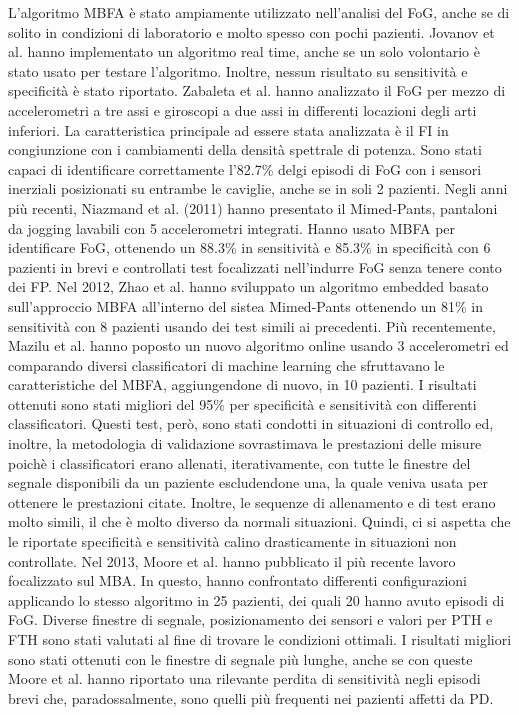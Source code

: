 L'algoritmo MBFA è stato ampiamente utilizzato nell'analisi del FoG, anche se di solito in condizioni di laboratorio e molto spesso con pochi pazienti. Jovanov et al. hanno implementato un algoritmo real time, anche se un solo volontario è stato usato per testare l'algoritmo. Inoltre, nessun risultato su sensitività e specificità è stato riportato\cite{22}. Zabaleta et al. hanno analizzato il FoG per mezzo di accelerometri a tre assi e giroscopi a due assi in differenti locazioni degli arti inferiori. La caratteristica principale ad essere stata analizzata è il FI in congiunzione con i cambiamenti della densità spettrale di potenza. Sono stati capaci di identificare correttamente l'82.7\% delgi episodi di FoG con i sensori inerziali posizionati su entrambe le caviglie, anche se in soli 2 pazienti\cite{24}.  \newline
Negli anni più recenti, Niazmand et al. (2011) hanno presentato il Mimed-Pants\cite{26}, pantaloni da jogging lavabili con 5 accelerometri integrati. Hanno usato MBFA per identificare FoG, ottenendo un 88.3\% in sensitività e 85.3\% in specificità con 6 pazienti in brevi e controllati test focalizzati nell'indurre FoG senza tenere conto dei FP. Nel 2012, Zhao et al.\cite{46} hanno sviluppato un algoritmo embedded basato sull'approccio MBFA all'interno del sistea Mimed-Pants ottenendo un 81\% in sensitività con 8 pazienti usando dei test simili ai precedenti. Più recentemente, Mazilu et al. hanno poposto un nuovo algoritmo online usando 3 accelerometri ed comparando diversi classificatori di machine learning che sfruttavano le caratteristiche del MBFA, aggiungendone di nuovo, in 10 pazienti\cite{48}. I risultati ottenuti sono stati migliori del 95\% per specificità e sensitività con differenti classificatori. Questi test, però, sono stati condotti in situazioni di controllo ed, inoltre, la metodologia di validazione sovrastimava le prestazioni delle misure poichè i classificatori erano allenati, iterativamente, con tutte le finestre del segnale disponibili da un paziente escludendone una, la quale veniva usata per ottenere le prestazioni citate. Inoltre, le sequenze di allenamento e di test erano molto simili, il che è molto diverso da normali situazioni. Quindi, ci si aspetta che le riportate specificità e sensitività calino drasticamente in situazioni non controllate. \newline
Nel 2013, Moore et al. hanno pubblicato il più recente lavoro focalizzato sul MBA. In questo, hanno confrontato differenti configurazioni applicando lo stesso algoritmo in 25 pazienti, dei quali 20 hanno avuto episodi di FoG. Diverse finestre di segnale, posizionamento dei sensori e valori per PTH e FTH sono stati valutati al fine di trovare le condizioni ottimali. I risultati migliori sono stati ottenuti con le finestre di segnale più lunghe, anche se con queste Moore et al. hanno riportato una rilevante perdita di sensitività negli episodi brevi che, paradossalmente, sono quelli più frequenti nei pazienti affetti da PD\cite{27}.
